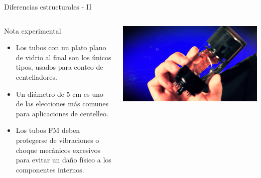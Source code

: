 \documentclass[a4paper,10pt]{beamer}
\begin{document}
\begin{frame}{Diferencias estructurales - II}
\begin{columns}[c]
\column{2in}
 \begin{exampleblock}{Nota experimental}
  \begin{itemize}[<+->]
   \item \begin{justify}
          Los tubos con un plato plano de vidrio al final son los únicos tipos,
	  usados para conteo de centelladores.
         \end{justify}
   \item \begin{justify}
          Un diámetro de 5 cm es uno de las elecciones más comunes para aplicaciones 
          de centelleo.
         \end{justify}
   \item \begin{justify}
          Los tubos FM deben protegerse de vibraciones o choque mecánicos excesivos 
          para evitar un daño físico a los componentes internos.
         \end{justify}
  \end{itemize}
 \end{exampleblock}

  \column{2in}
  
  \begin{center}
 \includegraphics[scale=0.08]{fig22}
 \end{center}
  
  \end{columns}
\end{frame}
\end{document}
